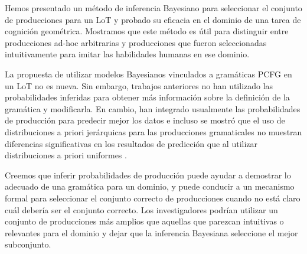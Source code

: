 
Hemos presentado un método de inferencia Bayesiano para seleccionar el conjunto de producciones para un LoT y probado su eficacia en el dominio de una tarea de cognición geométrica. Mostramos que este método es útil para distinguir entre producciones ad-hoc arbitrarias y producciones que fueron seleccionadas intuitivamente para imitar las habilidades humanas en ese dominio.


La propuesta de utilizar modelos Bayesianos vinculados a gramáticas PCFG en un LoT no es nueva. Sin embargo, trabajos anteriores no han utilizado las probabilidades inferidas para obtener más información sobre la definición de la gramática y modificarla. En cambio, han integrado usualmente las probabilidades de producción para predecir mejor los datos e incluso se mostró que el uso de distribuciones a priori jerárquicas para las producciones gramaticales no muestran diferencias significativas en los resultados de predicción que al utilizar distribuciones a priori uniformes \cite{piantadosi2012bootstrapping,yildirim2015learning}.


Creemos que inferir probabilidades de producción puede ayudar a demostrar lo adecuado de una gramática para un dominio, y puede conducir a un mecanismo formal para seleccionar el conjunto correcto de producciones cuando no está claro cuál debería ser el conjunto correcto. Los investigadores podrían utilizar un conjunto de producciones más amplios que aquellas que parezcan intuitivas o relevantes para el dominio y dejar que la inferencia Bayesiana seleccione el mejor subconjunto.

